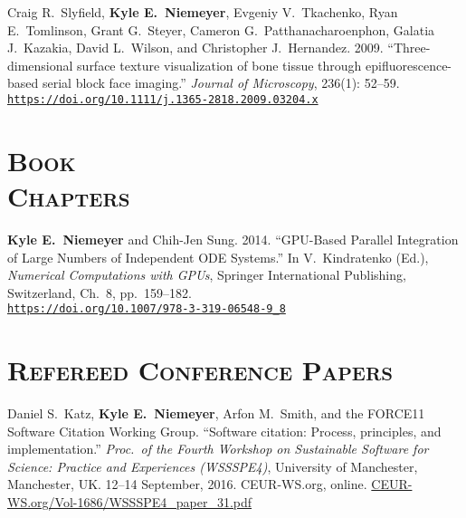\documentclass[margin,line,11pt]{res}
\makeatletter
\newlength{\bibhang}
\newlength{\bibsep}
 {\@listi \global\bibsep\itemsep \global\advance\bibsep by\parsep}
\newenvironment{bibenum*}
  {\renewcommand\labelenumi{\theenumi.}%
   \etaremune[
     topsep=0pt,
     itemsep=\bibsep,
     parsep=0pt,partopsep=0pt,
     itemindent=-\bibhang,
     leftmargin={\bibhang+\widthof{[999]}}]}
  {\endetaremune}
\newcommand*{\doi}[1]{\href{https://doi.org/#1}{\nolinkurl{https://doi.org/#1}}}
\makeatother
\begin{document}
\begin{resume}
\begin{bibenum*}
\item Craig R.\ Slyfield, \textbf{Kyle E.~Niemeyer}, Evgeniy V.\ Tkachenko, Ryan E.\ Tomlinson, Grant G.\ Steyer, Cameron G.\ \mbox{Patthanacharoenphon}, Galatia J.\ Kazakia, David L.\ Wilson, and Christopher J.\ Hernandez.
2009.
``Three-dimensional surface texture visualization of bone tissue through epifluorescence-based serial block face imaging.''
\emph{Journal of Microscopy}, 236(1): 52--59.
\doi{10.1111/j.1365-2818.2009.03204.x}

\end{bibenum*}

\section{\textsc{Book\\Chapters}}

\begin{bibenum*}

\item \textbf{Kyle E.~Niemeyer} and Chih-Jen Sung.
2014.
``GPU-Based Parallel Integration of Large Numbers of Independent ODE Systems.''
In V.\ Kindratenko (Ed.), \emph{Numerical Computations with GPUs}, Springer International Publishing, Switzerland, Ch.\ 8, pp.\ 159--182. \\
\doi{10.1007/978-3-319-06548-9_8}

\end{bibenum*}

\section{\textsc{Refereed Conference Papers}}

\begin{bibenum*}

\item Daniel S.\ Katz, \textbf{Kyle E.~Niemeyer}, Arfon M.\ Smith, and the FORCE11 Software Citation Working Group.
``Software citation: Process, principles, and implementation.''
\emph{Proc.\ of the Fourth Workshop on Sustainable Software for Science: Practice and Experiences (WSSSPE4)},
University of Manchester, Manchester, UK.
12--14 September, 2016.
CEUR-WS.org, online.
\href{http://ceur-ws.org/Vol-1686/WSSSPE4_paper_31.pdf}{CEUR-WS.org/Vol-1686/WSSSPE4\_paper\_31.pdf}


\end{bibenum*}
\end{resume}
\end{document}
